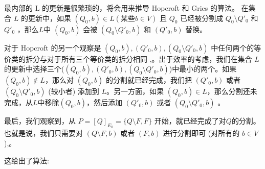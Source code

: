最内部的 L 的更新是很繁琐的，将会用来推导 Hopcroft 和 Gries 的算法。 在集合 $L$ 的更新中，如果 $ (Q_0,b) \in L (\mbox{某些}b \in V) $ 且 $Q_0$ 已经被分割成 $ Q_0 \setminus Q'_0 $ 和 $ Q'_0 $ ，那么$L$中 $(Q_0,b)$ 会被 $ (Q_0 \setminus Q'_0 ,b) $ 和 $ (Q'_0 ,b) $ 替换。

对于 Hopcroft 的另一个观察是 $ (Q_0,b),(Q'_0,b) ,(Q_0 \setminus Q'_0,b) $ 中任何两个的等价类的拆分与对于所有三个等价类的拆分相同 \cite[pp. 190-191]{Hopc71},\cite[引理 6]{Grie73}。出于效率的考虑，我们在集合 $L$ 的更新中选择三个($ (Q_0,b),(Q'_0,b) ,(Q_0 \setminus Q'_0,b) $)中最小的两个。如果 $(Q_0,b) \not\in L$，那么对 $(Q_0,b)$ 的分割就已经完成，我们把 $ (Q'_0,b) $ 或者  $ (Q_0 \setminus Q'_0,b) $ (较小者) 添加到 $L$。另一方面，如果  $(Q_0,b) \in L$，那么分割还未完成，从$L$中移除$(Q_0,b)$，然后添加 $ (Q'_0,b) $ 或者  $ (Q_0 \setminus Q'_0,b) $ 。

最后，我们观察到，从 $ P= [Q]_{E_0} = \{ Q \setminus F,F \} $ 开始，就已经完成了对$Q$的分割。也就是说，我们只需要对 $ ( Q \setminus F,b ) $ 或者 $ (F,b) $ 进行分割即可 (对所有的 $b\in V$)\cite[pp. 190-191]{Hopc71},\cite[引理 6]{Grie73}。

这给出了算法:%

